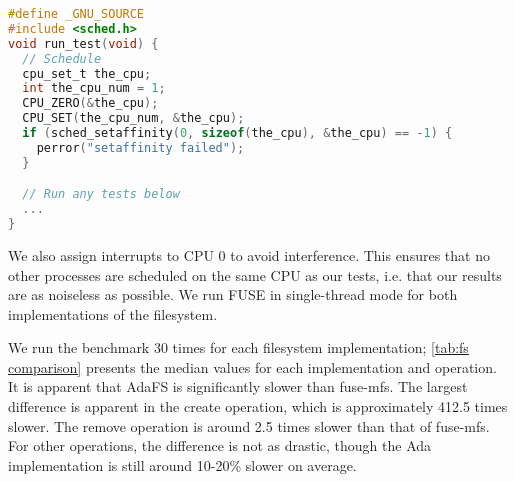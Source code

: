 \begin{lstlisting}[caption={Schedule a test on CPU 1}, label={code:schedule test}, language=C]
#define _GNU_SOURCE
#include <sched.h>
void run_test(void) {
  // Schedule
  cpu_set_t the_cpu;
  int the_cpu_num = 1;
  CPU_ZERO(&the_cpu);
  CPU_SET(the_cpu_num, &the_cpu);
  if (sched_setaffinity(0, sizeof(the_cpu), &the_cpu) == -1) {
    perror("setaffinity failed");
  }

  // Run any tests below
  ...
}
\end{lstlisting}

We also assign interrupts to CPU 0 to avoid interference.
This ensures that no other processes are scheduled on the same CPU as our tests, i.e. that our results are as noiseless as possible.
We run FUSE in single-thread mode for both implementations of the filesystem.

We run the benchmark 30 times for each filesystem implementation; \autoref{tab:fs comparison} presents the median values for each implementation and operation.
It is apparent that AdaFS is significantly slower than fuse-mfs.
The largest difference is apparent in the create operation, which is approximately 412.5 times slower.
The remove operation is around 2.5 times slower than that of fuse-mfs.
For other operations, the difference is not as drastic, though the Ada implementation is still around 10-20\% slower on average.

